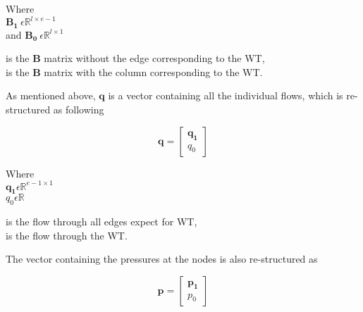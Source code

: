 \begin{minipage}[t]{0.18\textwidth}
Where\\
\hspace*{8mm} $\pmb{B_1} \: \epsilon \mathbb{R}^{l \times e-1}$  \\
and \hspace*{0.4mm} $\pmb{B_0} \: \epsilon \mathbb{R}^{l \times 1} $ 
\end{minipage}
\begin{minipage}[t]{0.70\textwidth}
\vspace*{2mm}
\hspace*{4mm} is the $\pmb{B}$ matrix without the edge corresponding to the WT,\\
\hspace*{4mm} is the $\pmb{B}$ matrix with the column corresponding to the WT.
\end{minipage}

As mentioned above, $\pmb{q}$ is a vector containing all the individual flows, which 
is re-structured as following

\begin{equation}
\pmb{q} =
\begin{bmatrix}
         \pmb{q_1} \\
	q_0 
\end{bmatrix}
\label{qmatrix}
\end{equation}

\begin{minipage}[t]{0.20\textwidth}
Where\\
\hspace*{8mm} $\pmb{q_1} \epsilon \mathbb{R}^{e-1 \times 1}$  \\
\hspace*{8mm} $q_0 \epsilon \mathbb{R} $ 
\end{minipage}
\begin{minipage}[t]{0.68\textwidth}
\vspace*{2mm}
\hspace*{4mm} is the flow through all edges expect for WT,\\
\hspace*{4mm} is the flow through the WT. 
\end{minipage}

The vector containing the pressures at the nodes is also re-structured as

\begin{equation}
\pmb{p} =
\begin{bmatrix}
         \pmb{p_1} \\
	p_0 
\end{bmatrix}
\end{equation}

